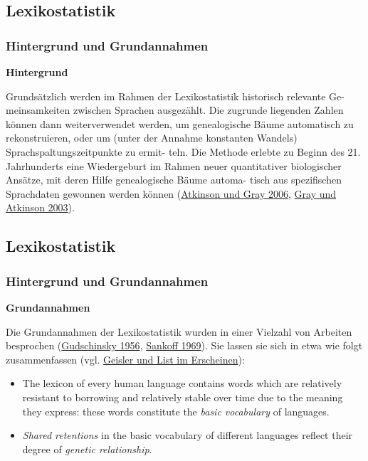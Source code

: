 \subsection{\texorpdfstring{{Lexikostatistik}}{Lexikostatistik}}

\subsubsection{\texorpdfstring{{Hintergrund und
Grundannahmen}}{Hintergrund und Grundannahmen}}

\textbf{Hintergrund}

Grundsätzlich werden im Rahmen der Lexikostatistik historisch relevante
Ge- meinsamkeiten zwischen Sprachen ausgezählt. Die zugrunde liegenden
Zahlen können dann weiterverwendet werden, um genealogische Bäume
automatisch zu rekonstruieren, oder um (unter der Annahme konstanten
Wandels) Sprachspaltungszeitpunkte zu ermit- teln. Die Methode erlebte
zu Beginn des 21. Jahrhunderts eine Wiedergeburt im Rahmen neuer
quantitativer biologischer Ansätze, mit deren Hilfe genealogische Bäume
automa- tisch aus spezifischen Sprachdaten gewonnen werden können
(\href{http://bibliography.lingpy.org?key=Atkinson2006}{Atkinson und
Gray 2006}, \href{http://bibliography.lingpy.org?key=Gray2003}{Gray und
Atkinson 2003}).

\subsection{\texorpdfstring{{Lexikostatistik}}{Lexikostatistik}}

\subsubsection{\texorpdfstring{{Hintergrund und
Grundannahmen}}{Hintergrund und Grundannahmen}}

\textbf{Grundannahmen}

Die Grundannahmen der Lexikostatistik wurden in einer Vielzahl von
Arbeiten besprochen
(\href{http://bibliography.lingpy.org?key=Gudschinsky1956}{Gudschinsky
1956}, \href{http://bibliography.lingpy.org?key=Sankoff1969}{Sankoff
1969}). Sie lassen sie sich in etwa wie folgt zusammenfassen (vgl.
\href{http://lingulist.de/jump.php?paper=Geisler2014\&href=documents/beautiful_trees.pdf}{Geisler
und List im Erscheinen}):

\begin{itemize}
\item
  The lexicon of every human language contains words which are
  relatively resistant to borrowing and relatively stable over time due
  to the meaning they express: these words constitute the \emph{basic
  vocabulary} of languages.
\item
  \emph{Shared retentions} in the basic vocabulary of different
  languages reflect their degree of \emph{genetic relationship}.
\end{itemize}

